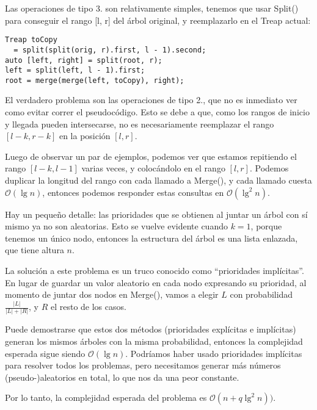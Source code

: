 Las operaciones de tipo 3. son relativamente simples, tenemos que usar Split() para conseguir el rango [l, r] del árbol original, y reemplazarlo en el Treap actual:

\begin{verbatim}
Treap toCopy 
  = split(split(orig, r).first, l - 1).second;
auto [left, right] = split(root, r);
left = split(left, l - 1).first;
root = merge(merge(left, toCopy), right);
\end{verbatim}

El verdadero problema son las operaciones de tipo 2., que no es inmediato ver como evitar correr el pseudocódigo. 
Esto se debe a que, como los rangos de inicio y llegada pueden intersecarse, no es necesariamente reemplazar el rango \([l - k, r - k]\) en la posición \([l, r]\).



Luego de observar un par de ejemplos, podemos ver que estamos repitiendo el rango \([l - k, l - 1]\) varias veces, y colocándolo en el rango \([l, r]\).
Podemos duplicar la longitud del rango con cada llamado a Merge(), y cada llamado cuesta \(\mathcal{O}(\lg n)\), entonces podemos responder estas consultas en \(\mathcal{O}(\lg^2 n)\).

Hay un pequeño detalle: las prioridades que se obtienen al juntar un árbol con sí mismo ya no son aleatorias.
Esto se vuelve evidente cuando \(k = 1\), porque tenemos un único nodo, entonces la estructura del árbol es una lista enlazada, que tiene altura \(n\).

La solución a este problema es un truco conocido como ``prioridades implícitas''.
En lugar de guardar un valor aleatorio en cada nodo expresando su prioridad,
al momento de juntar dos nodos en Merge(), vamos a elegir \(L\) con probabilidad \(\frac{|L|}{|L| + |R|}\), y \(R\) el resto de los casos.

Puede demostrarse que estos dos métodos (prioridades explícitas e implícitas) generan los mismos árboles con la misma probabilidad, 
entonces la complejidad esperada sigue siendo \(\mathcal{O}(\lg n)\).
Podríamos haber usado prioridades implícitas para resolver todos los problemas,
pero necesitamos generar más números (pseudo-)aleatorios en total, lo que nos da una peor constante.

Por lo tanto, la complejidad esperada del problema es \(\mathcal{O}(n + q \lg^2 n))\).